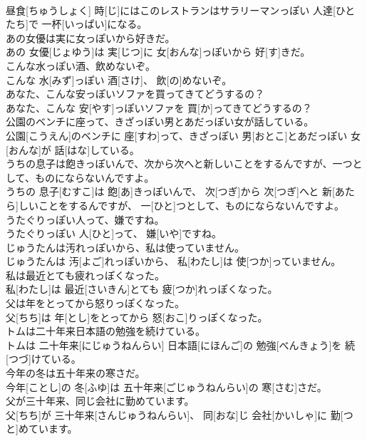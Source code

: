 \documentclass[8pt]{extreport}
\begin{document}
\begin{CJK}{UTF8}{min}
\\	昼食[ちゅうしょく] 時[じ]にはこのレストランはサラリーマンっぽい 人達[ひとたち]で 一杯[いっぱい]になる。
\\	あの女優は実に女っぽいから好きだ。	
\\	あの 女優[じょゆう]は 実[じつ]に 女[おんな]っぽいから 好[す]きだ。
\\	こんな水っぽい酒、飲めないぞ。	
\\	こんな 水[みず]っぽい 酒[さけ]、 飲[の]めないぞ。
\\	あなた、こんな安っぽいソファを買ってきてどうするの？	
\\	あなた、こんな 安[やす]っぽいソファを 買[か]ってきてどうするの？
\\	公園のベンチに座って、きざっぽい男とあだっぽい女が話している。	
\\	公園[こうえん]のベンチに 座[すわ]って、きざっぽい 男[おとこ]とあだっぽい 女[おんな]が 話[はな]している。
\\	うちの息子は飽きっぽいんで、次から次へと新しいことをするんですが、一つとして、ものにならないんですよ。	
\\	うちの 息子[むすこ]は 飽[あ]きっぽいんで、 次[つぎ]から 次[つぎ]へと 新[あたら]しいことをするんですが、 一[ひと]つとして、ものにならないんですよ。
\\	うたぐりっぽい人って、嫌ですね。	
\\	うたぐりっぽい 人[ひと]って、 嫌[いや]ですね。
\\	じゅうたんは汚れっぽいから、私は使っていません。	
\\	じゅうたんは 汚[よご]れっぽいから、 私[わたし]は 使[つか]っていません。
\\	私は最近とても疲れっぽくなった。	
\\	私[わたし]は 最近[さいきん]とても 疲[つか]れっぽくなった。
\\	父は年をとってから怒りっぽくなった。	
\\	父[ちち]は 年[とし]をとってから 怒[おこ]りっぽくなった。
\\	トムは二十年来日本語の勉強を続けている。	
\\	トムは 二十年来[にじゅうねんらい] 日本語[にほんご]の 勉強[べんきょう]を 続[つづ]けている。
\\	今年の冬は五十年来の寒さだ。	
\\	今年[ことし]の 冬[ふゆ]は 五十年来[ごじゅうねんらい]の 寒[さむ]さだ。
\\	父が三十年来、同じ会社に勤めています。	
\\	父[ちち]が 三十年来[さんじゅうねんらい]、 同[おな]じ 会社[かいしゃ]に 勤[つと]めています。

\end{CJK}
\end{document}
